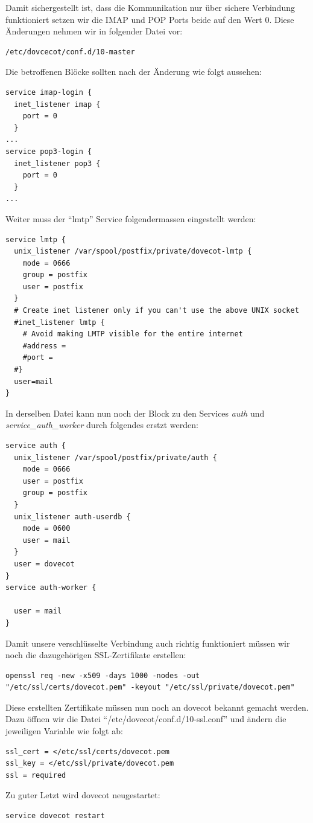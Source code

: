 Damit sichergestellt ist, dass die Kommunikation nur über sichere Verbindung funktioniert setzen wir die IMAP und POP Ports beide auf den Wert 0. Diese Änderungen nehmen wir in folgender Datei vor:

\begin{lstlisting}
/etc/dovcecot/conf.d/10-master
\end{lstlisting}

Die betroffenen Blöcke sollten nach der Änderung wie folgt aussehen:

\begin{lstlisting}
service imap-login {
  inet_listener imap {
    port = 0
  }
...
service pop3-login {
  inet_listener pop3 {
    port = 0
  }
...
\end{lstlisting}

Weiter muss der ``lmtp'' Service folgendermassen eingestellt werden:

\begin{lstlisting}
service lmtp {
  unix_listener /var/spool/postfix/private/dovecot-lmtp {
    mode = 0666
    group = postfix
    user = postfix
  }
  # Create inet listener only if you can't use the above UNIX socket
  #inet_listener lmtp {
    # Avoid making LMTP visible for the entire internet
    #address =
    #port =
  #}
  user=mail
}
\end{lstlisting}

In derselben Datei kann nun noch der Block zu den Services \textit{auth} und \textit{service\_auth\_worker} durch folgendes erstzt werden:

\begin{lstlisting}
service auth {
  unix_listener /var/spool/postfix/private/auth {
    mode = 0666
    user = postfix
    group = postfix
  }
  unix_listener auth-userdb {
    mode = 0600
    user = mail
  }
  user = dovecot
}
service auth-worker {

  user = mail
}
\end{lstlisting}

Damit unsere verschlüsselte Verbindung auch richtig funktioniert müssen wir noch die dazugehörigen SSL-Zertifikate erstellen:

\begin{lstlisting}
openssl req -new -x509 -days 1000 -nodes -out "/etc/ssl/certs/dovecot.pem" -keyout "/etc/ssl/private/dovecot.pem"
\end{lstlisting}

Diese erstellten Zertifikate müssen nun noch an dovecot bekannt gemacht werden. Dazu öffnen wir die Datei ``/etc/dovecot/conf.d/10-ssl.conf'' und ändern die jeweiligen Variable wie folgt ab:

\begin{lstlisting}
ssl_cert = </etc/ssl/certs/dovecot.pem
ssl_key = </etc/ssl/private/dovecot.pem
ssl = required
\end{lstlisting}

Zu guter Letzt wird dovecot neugestartet:

\begin{lstlisting}
service dovecot restart
\end{lstlisting}
